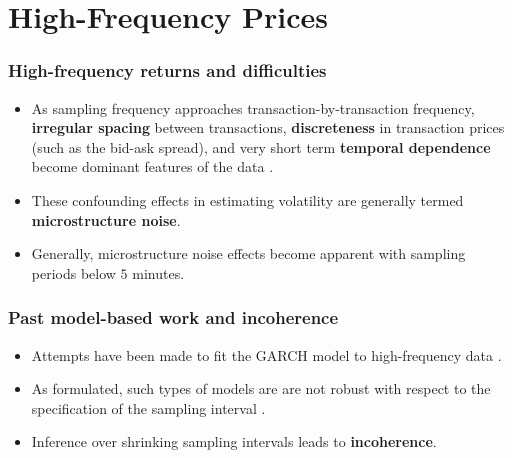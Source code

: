 \documentclass{beamer}
\begin{document}
\section{High-Frequency Prices}
\begin{frame}
  \frametitle{High-frequency returns and difficulties}
  \begin{itemize}
  \item As sampling frequency approaches transaction-by-transaction
    frequency, \textbf{irregular spacing} between transactions, \textbf{discreteness} in
    transaction prices (such as the bid-ask spread), and very short term \textbf{temporal dependence} become
    dominant features of the data \citep{stoll2000presidential}.

  \item These confounding effects in estimating volatility are
    generally termed \textbf{microstructure noise}.

  \item Generally, microstructure noise effects become apparent with
    sampling periods below $5$ minutes.
  \end{itemize}
\end{frame}
\begin{frame}
  \frametitle{Past model-based work and incoherence}
  \begin{itemize}
  \item Attempts have been made to fit the GARCH model to
    high-frequency data \citep{bollerslev1986,andersen1997intraday}.

  \item As formulated, such types of models are are not
    robust with respect to the specification of the sampling interval
    \citep{drost1993aggregation, andersen1997intraday,
      zumbach2000pitfalls}.

  \item Inference over shrinking sampling intervals leads to
    \textbf{incoherence}.
  \end{itemize}
\end{frame}
\end{document}
